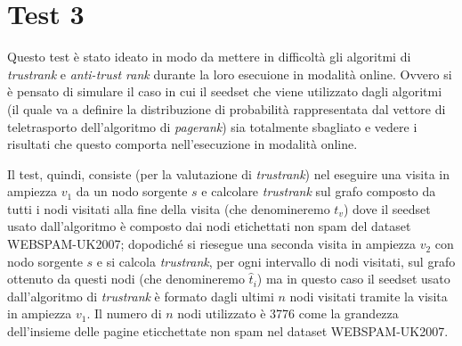 \section{Test 3}
Questo test è stato ideato in modo da mettere in difficoltà gli algoritmi di \textit{trustrank} e \textit{anti-trust rank} durante la loro esecuione in modalità online. Ovvero si è pensato di simulare il caso in cui il seedset che viene utilizzato dagli algoritmi (il quale va a definire la distribuzione di probabilità rappresentata dal vettore di teletrasporto dell'algoritmo di \textit{pagerank}) sia totalmente sbagliato e vedere i risultati che questo comporta nell'esecuzione in modalità online.

Il test, quindi, consiste (per la valutazione di \textit{trustrank}) nel eseguire una visita in ampiezza \(v_1\) da un nodo sorgente \(s\) e calcolare \textit{trustrank} sul grafo composto da tutti i nodi visitati alla fine della visita (che denomineremo \(t_v\)) dove il seedset usato dall'algoritmo è composto dai nodi etichettati non spam del dataset WEBSPAM-UK2007; dopodiché  si riesegue una seconda visita in ampiezza \(v_2\) con nodo sorgente \(s\) e si calcola \textit{trustrank}, per ogni intervallo di nodi visitati, sul grafo ottenuto da questi nodi (che denomineremo \(\hat{t}_i\)) ma in questo caso il seedset usato dall'algoritmo di \textit{trustrank} è formato dagli ultimi \(n\) nodi visitati tramite la visita in ampiezza \(v_1\). Il numero di \(n\) nodi utilizzato è 3776 come la grandezza dell'insieme delle pagine eticchettate non spam nel dataset WEBSPAM-UK2007.



